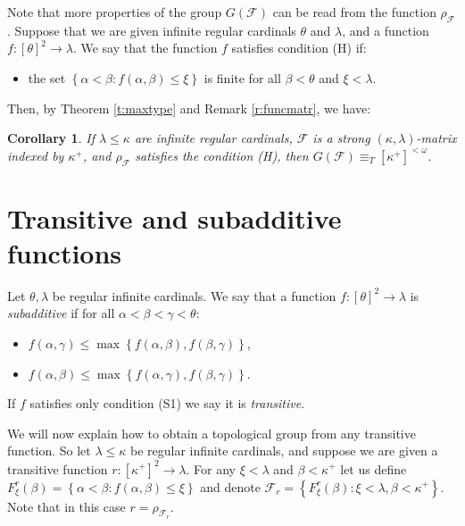 \documentclass{amsart}
\theoremstyle{plain}
\newtheorem{corollary}[theorem]{Corollary}
\theoremstyle{definition}
\numberwithin{equation}{section}
\renewcommand{\a}{\alpha}
\renewcommand{\b}{\beta}
\newcommand{\g}{\gamma}
\renewcommand{\k}{\kappa}
\renewcommand{\o}{\omega}
\renewcommand{\l}{\lambda}
\newcommand{\set}[1]{\left\{#1\right\}}
\begin{document}
Note that more properties of the group $G(\mathcal F)$ can be read from the function $\rho_{\mathcal F}$.
Suppose that we are given infinite regular cardinals $\theta$ and $\l$, and a function $f:[\theta]^2\to\l$. We say that the function $f$ satisfies condition (H) if:
\begin{itemize}
	\item[(H)] the set $\set{\a<\b:f(\a,\b)\le\xi}$ is finite for all $\b<\theta$ and $\xi<\l$.
\end{itemize}
Then, by Theorem \ref{t:maxtype} and Remark \ref{r:funcmatr}, we have:

\begin{corollary}\label{c:maxtypeH}
	If $\l\le\k$ are infinite regular cardinals, $\mathcal F$ is a strong $(\k,\l)$-matrix indexed by $\k^+$, and $\rho_{\mathcal F}$ satisfies the condition (H), then $G(\mathcal F)\equiv_T [\k^+]^{<\o}$. 
\end{corollary}


\section{Transitive and subadditive functions}\label{s:subadditive}

Let $\theta,\l$ be regular infinite cardinals.
We say that a function $f:[\theta]^2\to \l$ is \emph{subadditive} if for all $\a<\b<\g<\theta$:
\begin{itemize}
	\item[(S1)] $f(\a,\g)\le\max\set{f(\a,\b),f(\b,\g)}$,
	\item[(S2)] $f(\a,\b)\le\max\set{f(\a,\g),f(\b,\g)}$.
\end{itemize}
If $f$ satisfies only condition (S1) we say it is \emph{transitive}.

We will now explain how to obtain a topological group from any transitive function.
So let $\l\le\k$ be regular infinite cardinals, and suppose we are given a transitive function $r:[\k^+]^2\to\l$.
For any $\xi<\l$ and $\b<\k^+$ let us define $F^r_{\xi}(\b)=\set{\a<\b:f(\a,\b)\le\xi}$ and denote $\mathcal F_r=\set{F^r_{\xi}(\b):\xi<\l,\b<\k^+}$.
Note that in this case $r=\rho_{\mathcal F_r}$.
\end{document}

